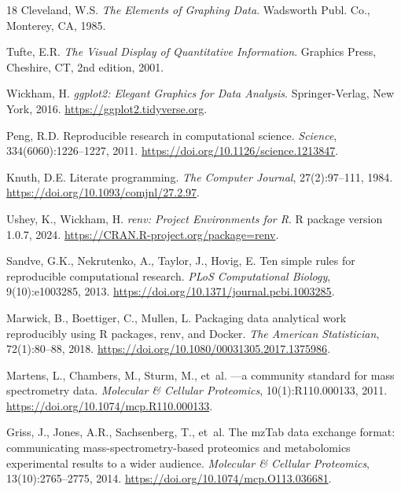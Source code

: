 \documentclass[11pt,twoside,openright]{book}
\begin{document}
\begin{thebibliography}{18}
Cleveland, W.S.
\newblock \emph{The Elements of Graphing Data}.
\newblock Wadsworth Publ. Co., Monterey, CA, 1985.

Tufte, E.R.
\newblock \emph{The Visual Display of Quantitative Information}.
\newblock Graphics Press, Cheshire, CT, 2nd edition, 2001.

Wickham, H.
\newblock \emph{ggplot2: Elegant Graphics for Data Analysis}.
\newblock Springer-Verlag, New York, 2016.
\newblock \url{https://ggplot2.tidyverse.org}.

Peng, R.D.
\newblock Reproducible research in computational science.
\newblock \emph{Science}, 334(6060):1226--1227, 2011.
\newblock \url{https://doi.org/10.1126/science.1213847}.

Knuth, D.E.
\newblock Literate programming.
\newblock \emph{The Computer Journal}, 27(2):97--111, 1984.
\newblock \url{https://doi.org/10.1093/comjnl/27.2.97}.

Ushey, K., Wickham, H.
\newblock \emph{renv: Project Environments for R}.
\newblock R package version 1.0.7, 2024.
\newblock \url{https://CRAN.R-project.org/package=renv}.

Sandve, G.K., Nekrutenko, A., Taylor, J., Hovig, E.
\newblock Ten simple rules for reproducible computational research.
\newblock \emph{PLoS Computational Biology}, 9(10):e1003285, 2013.
\newblock \url{https://doi.org/10.1371/journal.pcbi.1003285}.

Marwick, B., Boettiger, C., Mullen, L.
\newblock Packaging data analytical work reproducibly using {R} packages, renv, and {Docker}.
\newblock \emph{The American Statistician}, 72(1):80--88, 2018.
\newblock \url{https://doi.org/10.1080/00031305.2017.1375986}.

Martens, L., Chambers, M., Sturm, M., et~al.
---a community standard for mass spectrometry data.
\newblock \emph{Molecular \& Cellular Proteomics}, 10(1):R110.000133, 2011.
\newblock \url{https://doi.org/10.1074/mcp.R110.000133}.

Griss, J., Jones, A.R., Sachsenberg, T., et~al.
\newblock The {mzTab} data exchange format: communicating mass-spectrometry-based proteomics and metabolomics experimental results to a wider audience.
\newblock \emph{Molecular \& Cellular Proteomics}, 13(10):2765--2775, 2014.
\newblock \url{https://doi.org/10.1074/mcp.O113.036681}.

\end{thebibliography}
\end{document}
